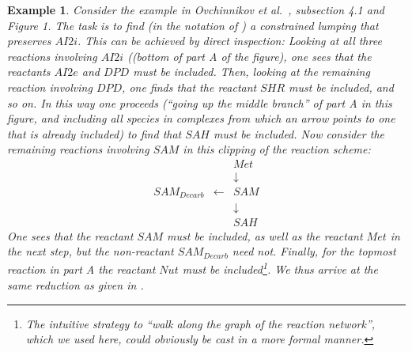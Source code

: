 \documentclass{article}
\newtheorem{example}{Example}
\begin{document}

\begin{example}{\em
Consider the example in Ovchinnikov et al.~\cite{OVPT2021}, subsection 4.1 and Figure 1. The task is to find (in the notation of \cite{OVPT2021}) a constrained lumping that preserves $AI2i$. This can be achieved by direct inspection: Looking at all three reactions involving $AI2i$ ((bottom of part A of the figure), one sees that the reactants $AI2e$ and $DPD$ must be included. Then, looking at the remaining reaction involving $DPD$, one finds that the reactant $SHR$ must be included, and so on. In this way one proceeds (``going up the middle branch'' of part A in this figure, and including all species in complexes from which an arrow points to one that is already included) to find that $SAH$ must be included. Now consider the remaining reactions involving $SAM$ in this clipping of the reaction scheme:
\[
\begin{array}{ccc}
   &  &  Met\\
     & & \downarrow\\
   SAM_{Decarb}&\leftarrow &SAM\\
   & & \downarrow\\
   & & SAH
\end{array}
\]
One sees that the reactant $SAM$ must be included, as well as the reactant $Met$ in the next step, but the non-reactant $SAM_{Decarb}$ need not. Finally, for the topmost reaction in part A the reactant $Nut$ must be included\footnote{The intuitive strategy to ``walk along the graph of the reaction network'', which we used here, could obviously be cast in a more formal manner.}. We thus arrive at the same reduction as given in \cite{OVPT2021}.}
\end{example}
\end{document}
